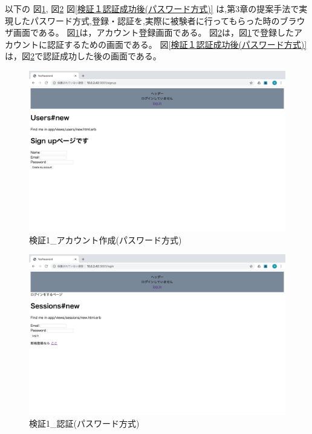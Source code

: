     以下の
    図\ref{検証１アカウント作成(パスワード方式)},
    図\ref{検証１認証(パスワード方式)}
    図\ref{検証１認証成功後(パスワード方式)}
    は,第3章の提案手法で実現したパスワード方式,登録・認証を,実際に被験者に行ってもらった時のブラウザ画面である。
    図\ref{検証１アカウント作成(パスワード方式)}は，アカウント登録画面である。
    図\ref{検証１認証(パスワード方式)}は，図\ref{検証１アカウント作成(パスワード方式)}で登録したアカウントに認証するための画面である。
    図\ref{検証１認証成功後(パスワード方式)}は，図\ref{検証１認証(パスワード方式)}で認証成功した後の画面である。
    \vspace{4cm}%
    \begin{figure}[H]
        \includegraphics[width=15cm]{./fig/chapter4/inspect_1/password_screnn/sign_up.png}
        \caption{検証1\_アカウント作成(パスワード方式)}
        \label{検証１アカウント作成(パスワード方式)}
    \end{figure}

    \vspace{4cm}%
    \begin{figure}[H]
        \includegraphics[width=15cm]{./fig/chapter4/inspect_1/password_screnn/login.png}
        \caption{検証1\_認証(パスワード方式)}
        \label{検証１認証(パスワード方式)}
    \end{figure}

